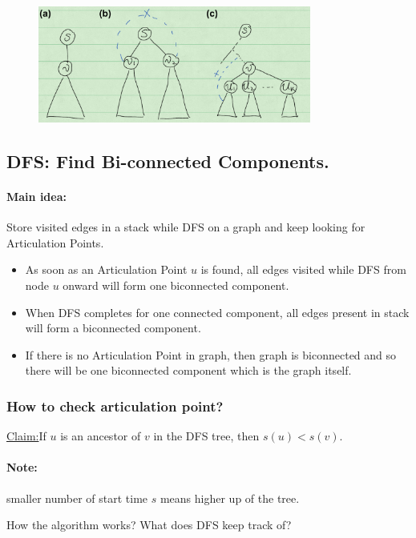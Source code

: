 \documentclass[en,hazy,blue,normal,12pt]{elegantnote}
\newenvironment{claim}[1]{\par\noindent\underline{Claim:}\space#1}{}
\begin{document}
\begin{figure}[H]
\centering
\includegraphics[width=0.8\textwidth]{find-articulation.png}
\end{figure}

\subsection{DFS: Find Bi-connected Components.}
\paragraph{Main idea:} Store visited edges in a stack while DFS on a graph and keep looking for Articulation Points. 
\begin{itemize}
 \item As soon as an Articulation Point $u$ is found, all edges visited while DFS from node $u$ onward will form one biconnected component. 
 \item When DFS completes for one connected component, all edges present in stack will form a biconnected component.
 \item If there is no Articulation Point in graph, then graph is biconnected and so there will be one biconnected component which is the graph itself.
\end{itemize}

\subsubsection{How to check articulation point?}
\begin{claim}
 If $u$ is an ancestor of $v$ in the DFS tree, then $s(u) < s(v)$.
\end{claim}
\paragraph{Note:} smaller number of start time $s$ means higher up of the tree. 

How the algorithm works? What does DFS keep track of? 
\end{document}
